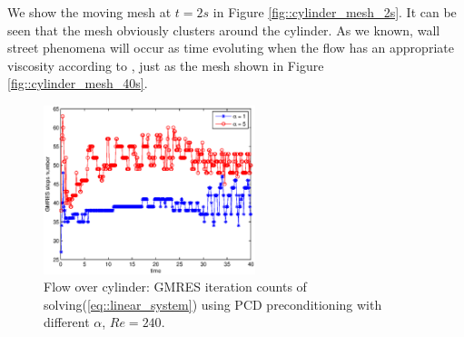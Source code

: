 \documentclass{eajam}
\begin{document}
      We show the moving mesh at $t = 2s$ in Figure
      \ref{fig::cylinder_mesh_2s}. It can be seen that the mesh obviously
      clusters around the cylinder. As we known, wall street phenomena
      will occur as time evoluting when the flow has an appropriate
      viscosity according to \cite{milton1982album}, just as the mesh
      shown in Figure \ref{fig::cylinder_mesh_40s}.
      
      \begin{figure}[!htbp]
        \begin{center}
          \includegraphics[width = 0.55\textwidth]{picture/obstacle_flow_data/iteration_steps_via_alpha.eps}
        \end{center}
        \caption{\small Flow over cylinder: GMRES iteration counts of
                 solving(\ref{eq::linear_system}) using PCD
                 preconditioning with different $\alpha$, $Re = 240$.}
        \label{fig::cylinder_GMRES_steps_comparation}
      \end{figure}
      
\end{document}
